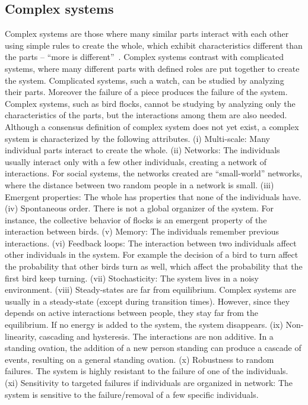 \subsection{Complex systems}
\label{sec:characteristics}
Complex systems are those where many similar parts interact with each other using simple rules to create the whole,
which exhibit characteristics different than the parts --
``more is different''~\citep{anderson1972}.
Complex systems contrast with complicated systems, where many different parts with defined roles are put together to create the system. 
Complicated systems, such a watch, can be studied by analyzing their parts. 
Moreover the failure of a piece produces the failure of the system.
Complex systems, such as bird flocks, cannot be studying by analyzing only the characteristics of the parts, 
but the interactions among them are also needed.  
Although a consensus definition of complex system does not yet exist, a complex system is characterized by the following attributes. 
(i) Multi-scale: Many individual parts interact to create the whole. 
(ii) Networks: The individuals usually interact only with a few other individuals, creating a network of interactions. For social systems, the networks created are ``small-world'' networks, where the distance between two random people in a network is small.  
(iii) Emergent properties: The whole has properties that none of the individuals have. 
(iv) Spontaneous order. There is not a global organizer of the system. For instance, the collective behavior of flocks is an emergent property of the interaction between birds. 
(v) Memory: The individuals remember previous interactions. 
(vi) Feedback loops: The interaction between two individuals affect other individuals in the system. For example the decision of a bird to turn affect the probability that other birds turn as well, which affect the probability that the first bird keep turning.
(vii) Stochasticity: The system lives in a noisy environment. 
(viii) Steady-states are far from equilibrium. Complex systems are usually in a steady-state (except during transition times). However, since they depends on active interactions between people, they stay far from the equilibrium. If no energy is added to the system, the system disappears.
(ix) Non-linearity, cascading and hysteresis. The interactions are non additive. In a standing ovation, the addition of a new person standing can produce a cascade of events, resulting on a general standing ovation.
(x) Robustness to random failures. The system is highly resistant to the failure of one of the individuals. 
(xi) Sensitivity to targeted failures if individuals are organized in network: The system is sensitive to the failure/removal of a few specific individuals. 

